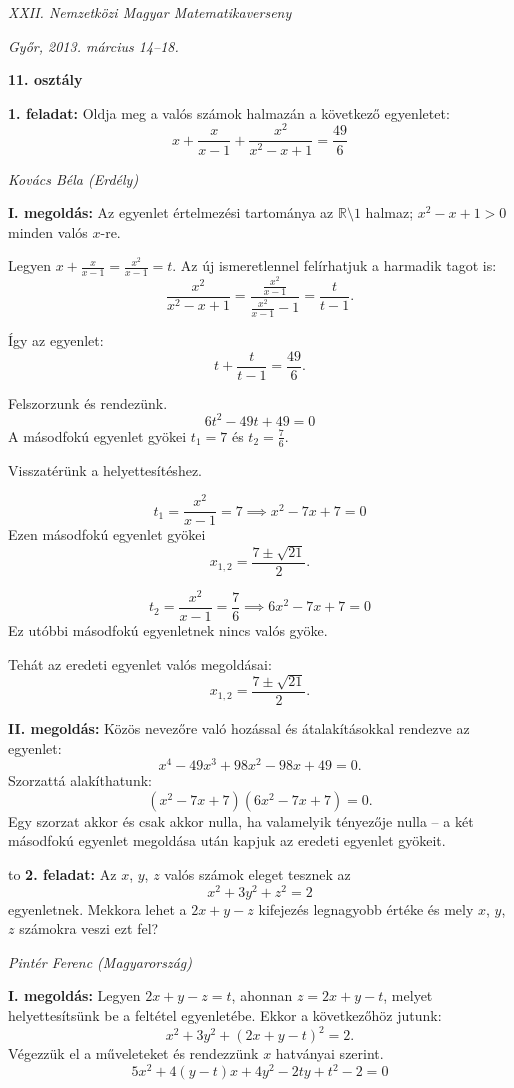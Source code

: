 \documentclass[a4paper,10pt]{article}
\newcommand{\ki}[2]{\hfill {\it #1 (#2)}\medskip}
\newcommand{\vonal}{\hbox to \hsize{\hskip2truecm\hrulefill\hskip2truecm}}
\begin{document}
\begin{center} \Large {\em XXII. Nemzetközi Magyar Matematikaverseny} \end{center}
\begin{center} \large{\em Győr, 2013. március 14--18.} \end{center}
\smallskip
\begin{center} \large{\bf 11. osztály} \end{center}
\bigskip

{\bf 1. feladat: } Oldja meg a valós számok halmazán a következő egyenletet:
\[x+\frac{x}{x-1}+\frac{x^2}{x^2-x+1}=\frac{49}{6}\]

\ki{Kovács Béla}{Erdély}\medskip

{\bf I. megoldás: } Az egyenlet értelmezési tartománya az $\mathbb{R}\setminus{1}$ halmaz; $x^2-x+1>0$ minden valós $x$-re.

Legyen $x+\frac{x}{x-1}=\frac{x^2}{x-1}=t$. Az új ismeretlennel felírhatjuk a harmadik tagot is:
\[\frac{x^2}{x^2-x+1}=\frac{\frac{x^2}{x-1}}{\frac{x^2}{x-1}-1}=\frac{t}{t-1}.\]

Így az egyenlet:
\[t+\frac{t}{t-1}=\frac{49}{6}.\]

Felszorzunk és rendezünk.
\[6t^2-49t+49=0\]
A másodfokú egyenlet gyökei $t_1=7$ és $t_2=\frac{7}{6}$.

Visszatérünk a helyettesítéshez.

\[t_1=\frac{x^2}{x-1}=7 \implies x^2-7x+7=0\]
Ezen másodfokú egyenlet gyökei
\[x_{1,2}=\frac{7\pm\sqrt{21}}{2}.\]

\[t_2=\frac{x^2}{x-1}=\frac{7}{6} \implies 6x^2-7x+7=0\]
Ez utóbbi másodfokú egyenletnek nincs valós gyöke.

Tehát az eredeti egyenlet valós megoldásai:
\[x_{1,2}=\frac{7\pm\sqrt{21}}{2}.\]
\medskip

{\bf II. megoldás: } Közös nevezőre való hozással és átalakításokkal rendezve az egyenlet:
\[x^4-49x^3+98x^2-98x+49=0.\]
Szorzattá alakíthatunk:
\[\left(x^2-7x+7\right)\left(6x^2-7x+7\right)=0.\]
Egy szorzat akkor és csak akkor nulla, ha valamelyik tényezője nulla -- a két másodfokú egyenlet megoldása után kapjuk az eredeti egyenlet gyökeit.
\medskip

\vonal
{\bf 2. feladat: } Az $x$, $y$, $z$ valós számok eleget tesznek az
\[x^2+3y^2+z^2=2\]
egyenletnek. Mekkora lehet a $2x+y-z$ kifejezés legnagyobb értéke és mely $x$, $y$, $z$
számokra veszi ezt fel?

\ki{Pintér Ferenc}{Magyarország}\medskip

{\bf I. megoldás: } Legyen $2x+y-z=t$, ahonnan $z=2x+y-t$, melyet helyettesítsünk be a feltétel egyenletébe. Ekkor a következőhöz jutunk:
\[x^2+3y^2+(2x+y-t)^2=2.\]
Végezzük el a műveleteket és rendezzünk $x$ hatványai szerint.
\[5x^2+4(y-t)x+4y^2-2ty+t^2-2=0\]
\end{document}

